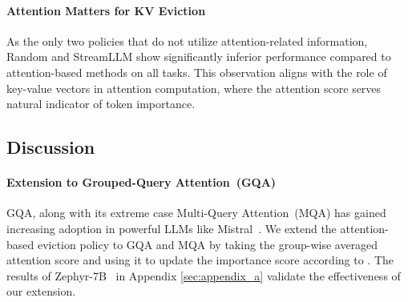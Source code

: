 \paragraph{Attention Matters for KV Eviction} As the only two policies that do not utilize attention-related information, Random and StreamLLM show significantly inferior performance compared to attention-based methods on all tasks. This observation aligns with the role of key-value vectors in attention computation, where the attention score serves natural indicator of token importance.
\subsection{Discussion}
\paragraph{Extension to Grouped-Query Attention~(GQA)} GQA, along with its extreme case Multi-Query Attention~(MQA) has gained increasing adoption in powerful LLMs like Mistral~\cite{mistral}. We extend the attention-based eviction policy to GQA and MQA by taking the group-wise averaged attention score and using it to update the importance score according to . The results of Zephyr-7B~\cite{tunstall2023zephyr} in Appendix \ref{sec:appendix_a} validate the effectiveness of our extension.
